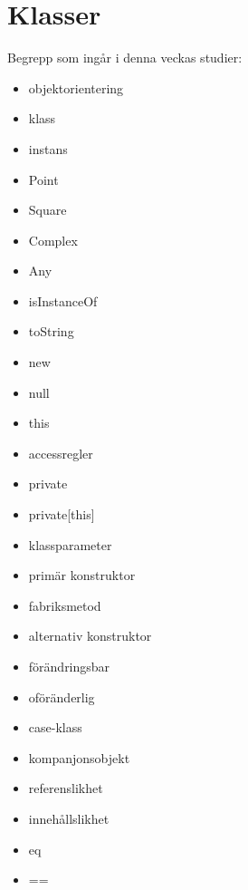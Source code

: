\chapter{Klasser}\label{chapter:W05}
Begrepp som ingår i denna veckas studier:
\begin{itemize}[noitemsep,label={$\square$},leftmargin=*]
\item objektorientering
\item klass
\item instans
\item Point
\item Square
\item Complex
\item Any
\item isInstanceOf
\item toString
\item new
\item null
\item this
\item accessregler
\item private
\item private[this]
\item klassparameter
\item primär konstruktor
\item fabriksmetod
\item alternativ konstruktor
\item förändringsbar
\item oföränderlig
\item case-klass
\item kompanjonsobjekt
\item referenslikhet
\item innehållslikhet
\item eq
\item ==\end{itemize}
